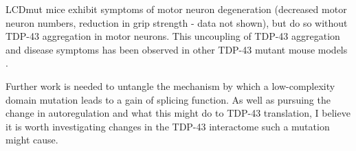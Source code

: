  LCDmut mice exhibit symptoms of motor neuron degeneration (decreased motor neuron numbers, reduction in grip strength - data not shown), but do so without TDP-43 aggregation in motor neurons. 
 This uncoupling of TDP-43 aggregation and disease symptoms has been observed in other TDP-43 mutant mouse models \citep{Arnold2013, Gordon2018}.
 
 Further work is needed to untangle the mechanism by which a low-complexity domain mutation leads to a gain of splicing function.
 As well as pursuing the change in autoregulation and what this might do to TDP-43 translation, I believe it is worth investigating changes in the TDP-43 interactome such a mutation might cause.
 
 
%
%
%
%	
%
%
%	
%	



